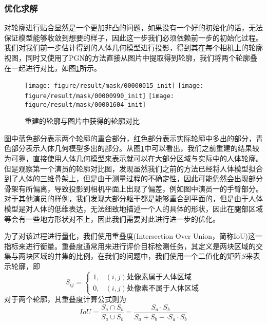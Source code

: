 \subsubsection{优化求解}
对轮廓进行贴合显然是一个更加非凸的问题，如果没有一个好的初始化的话，无法保证模型能够收敛到想要的样子，因此这一步我们必须依赖前一步的初始化过程。我们对我们前一步估计得到的人体几何模型进行投影，得到其在每个相机上的轮廓视图，同时又使用了PGN的方法直接从图片中提取得到轮廓，我们将两个轮廓叠在一起进行对比，如图\ref{fig:maskcom}所示。
\begin{figure}[htbp]
    \centering
    \texttt{[image: figure/result/mask/00000015\_init]} \hfill
    \texttt{[image: figure/result/mask/00000990\_init]} \hfill
    \texttt{[image: figure/result/mask/00001604\_init]}
    \caption{\label{fig:maskcom} 重建的轮廓与图片中获得的轮廓对比}
\end{figure}

图中蓝色部分表示两个轮廓的重合部分，红色部分表示实际轮廓中多出的部分，青色部分表示人体几何模型多出的部分。从图\ref{fig:maskcom}中可以看出，我们之前重建的结果较为可靠，直接使用人体几何模型来表示就可以在大部分区域与实际中的人体轮廓。但是观察第一个演员的轮廓对比图，发现虽然我们之前的方法已经将人体模型拟合到了人体的三维骨架上，但是由于测量过程的不确定性，因此可能仍然会出现部分骨架有所偏离，导致投影到相机平面上出现了偏差，例如图中演员一的手臂部分。对于其他演员的样例，我们发现大部分躯干都是能够重合到平面的，但是由于人体模型是对人体的低维表达，无法细致地描述一个人的具体的形状，因此在腿部区域等会有一些地方形状对不上，因此我们需要对此进行进一步的优化。

为了对该过程进行量化，我们使用重叠度(Intersection Over Union，简称IoU)这一指标来进行衡量。重叠度通常用来进行评价目标检测任务，其定义是两块区域的交集与两块区域的并集的比例，在我们的问题中，我们使用一个二值化的矩阵\(S\)来表示轮廓，即
\begin{equation}
    S_{ij} = \begin{cases}
        1, & \text{\((i,j)\)处像素属于人体区域} \\
        0, & \text{\((i,j)\)处像素不属于人体区域}
    \end{cases}
\end{equation}
对于两个轮廓，其重叠度计算公式则为
\begin{equation}
    IoU = \frac{S_a \cap S_b}{S_a \cup S_b} = \frac{S_a \cdot S_b}{S_a + S_b - \cdot S_a\cdot S_b}
\end{equation}

